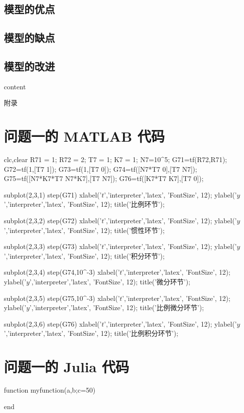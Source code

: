 \documentclass{HighSchoolBigDataCompetition}
\begin{document}
	\subsection{模型的优点}
	
	\subsection{模型的缺点}
	
	\subsection{模型的改进}
	\cite{label}

	\begin{thebibliography}{99}
	content
	\end{thebibliography}

	\newpage
	\appendix
	\begin{center}
		\heiti{} 附\hspace{1pc}录
	\end{center}
	\section{问题一的 MATLAB 代码}
	\begin{matlab}
clc,clear
R71 = 1;
R72 = 2;
T7 = 1;
K7 = 1;
N7=10^5;
G71=tf(R72,R71);
G72=tf(1,[T7 1]);
G73=tf(1,[T7 0]);
G74=tf([N7*T7 0],[T7 N7]);
G75=tf([N7*K7*T7 N7*K7],[T7 N7]);
G76=tf([K7*T7 K7],[T7 0]);

subplot(2,3,1)
step(G71)
xlabel('$t$','interpreter','latex', 'FontSize', 12);
ylabel('$y$','interpreter','latex', 'FontSize', 12);
title('比例环节');

subplot(2,3,2)
step(G72)
xlabel('$t$','interpreter','latex', 'FontSize', 12);
ylabel('$y$','interpreter','latex', 'FontSize', 12);
title('惯性环节');

subplot(2,3,3)
step(G73)
xlabel('$t$','interpreter','latex', 'FontSize', 12);
ylabel('$y$','interpreter','latex', 'FontSize', 12);
title('积分环节');

subplot(2,3,4)
step(G74,10^-3)
xlabel('$t$','interpreter','latex', 'FontSize', 12);
ylabel('$y$','interpreter','latex', 'FontSize', 12);
title('微分环节');

subplot(2,3,5)
step(G75,10^-3)
xlabel('$t$','interpreter','latex', 'FontSize', 12);
ylabel('$y$','interpreter','latex', 'FontSize', 12);
title('比例微分环节');

subplot(2,3,6)
step(G76)
xlabel('$t$','interpreter','latex', 'FontSize', 12);
ylabel('$y$','interpreter','latex', 'FontSize', 12);
title('比例积分环节');
	\end{matlab}
	\section{问题一的 Julia 代码}
	\begin{julia}
		function myfunction(a,b;c=50)

		end
	\end{julia}
\end{document}
